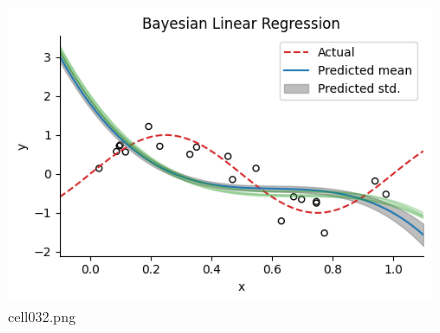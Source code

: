\begin{figure}[ht]
	\centering
	\includegraphics[scale=0.8, max width=\linewidth]{./fig/bayesian-brain/mcmc/cell032.png}
	\caption{cell032.png}
	\label{cell032.png}
\end{figure}